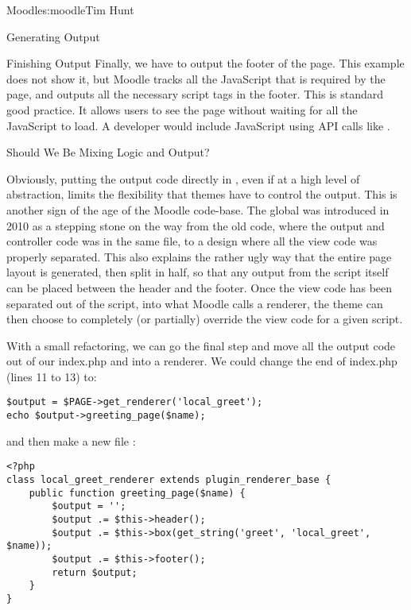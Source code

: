 \begin{aosachapter}{Moodle}{s:moodle}{Tim Hunt}
\begin{aosasect1}{Generating Output}
\begin{aosasect2}{Finishing Output}
Finally, we have to output the footer of the page. This example does
not show it, but Moodle tracks all the JavaScript that is required by
the page, and outputs all the necessary script tags in the
footer. This is standard good practice. It allows users to see the
page without waiting for all the JavaScript to load. A developer would
include JavaScript using API calls like
.

\end{aosasect2}

\begin{aosasect2}{Should We Be Mixing Logic and Output?}

Obviously, putting the output code directly in , even
if at a high level of abstraction, limits the flexibility that themes
have to control the output. This is another sign of the age of the
Moodle code-base. The  global was introduced in 2010 as
a stepping stone on the way from the old code, where the output and
controller code was in the same file, to a design where all the view
code was properly separated. This also explains the rather ugly way
that the entire page layout is generated, then split in half, so that
any output from the script itself can be placed between the header and
the footer. Once the view code has been separated out of the script,
into what Moodle calls a renderer, the theme can then choose to
completely (or partially) override the view code for a given script.

With a small refactoring, we can go the final step and move all the
output code out of our index.php and into a renderer. We could change
the end of index.php (lines 11 to 13) to:

\begin{verbatim}
$output = $PAGE->get_renderer('local_greet');
echo $output->greeting_page($name);
\end{verbatim}

and then make a new file :

\begin{verbatim}
<?php
class local_greet_renderer extends plugin_renderer_base {
    public function greeting_page($name) {
        $output = '';
        $output .= $this->header();
        $output .= $this->box(get_string('greet', 'local_greet', $name));
        $output .= $this->footer();
        return $output;
    }
}
\end{verbatim}


\end{aosasect2}
\end{aosasect1}
\end{aosachapter}
